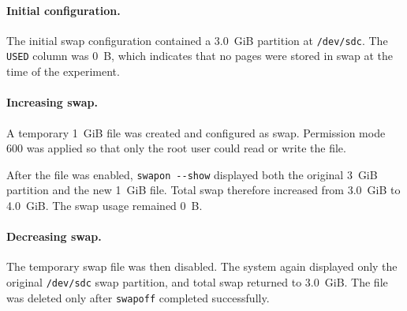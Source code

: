 
\paragraph{Initial configuration.}
The initial swap configuration contained a 3.0~GiB partition at
\texttt{/dev/sdc}. The \texttt{USED} column was 0~B, which indicates that no
pages were stored in swap at the time of the experiment.

\paragraph{Increasing swap.}
A temporary 1~GiB file was created and configured as swap. Permission mode 600
was applied so that only the root user could read or write the file.

After the file was enabled, \texttt{swapon}~\texttt{-{}-show} displayed both the original
3~GiB partition and the new 1~GiB file. Total swap therefore increased from
3.0~GiB to 4.0~GiB. The swap usage remained 0~B.

\paragraph{Decreasing swap.}
The temporary swap file was then disabled. The system again displayed only the
original \texttt{/dev/sdc} swap partition, and total swap returned to 3.0~GiB.
The file was deleted only after \texttt{swapoff} completed successfully.
